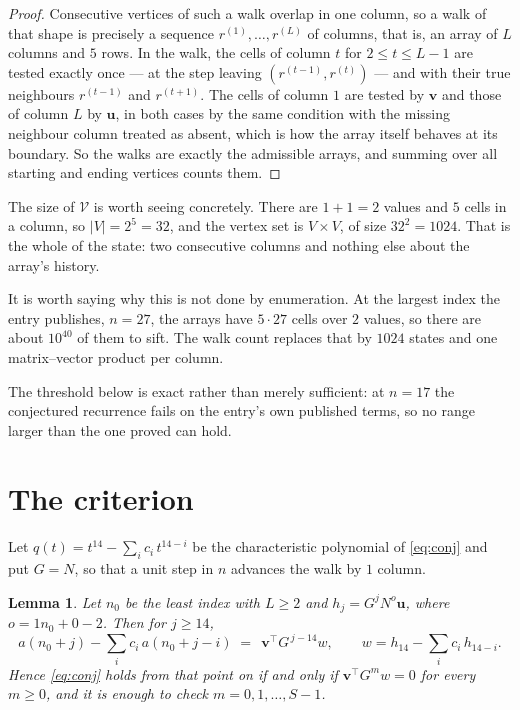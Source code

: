 \documentclass[11pt,a4paper]{article}
\theoremstyle{plain}
\newtheorem{lemma}[theorem]{Lemma}
\theoremstyle{definition}
\begin{document}
\begin{proof}
Consecutive vertices of such a walk overlap in one column, so a walk of that shape is
precisely a sequence $r^{(1)},\dots,r^{(L)}$ of columns, that is, an array of $L$ columns
and $5$ rows. In the walk, the cells of column $t$ for $2\le t\le L-1$ are tested
exactly once --- at the step leaving $(r^{(t-1)},r^{(t)})$ --- and with their true
neighbours $r^{(t-1)}$ and $r^{(t+1)}$. The cells of column $1$ are tested by
$\mathbf{v}$ and those of column $L$ by $\mathbf{u}$, in both cases by the same condition
with the missing neighbour column treated as absent, which is how the array itself behaves at
its boundary. So the walks are exactly the admissible arrays, and summing over all starting
and ending vertices counts them.
\end{proof}


The size of $\mathcal V$ is worth seeing concretely. There are $1+1=2$ values
and $5$ cells in a column, so $|V|=2^{5}=32$, and the vertex set is
$V\times V$, of size $32^2=1024$. That is the whole of the state: two consecutive
columns and nothing else about the array's history.

It is worth saying why this is not done by enumeration. At the largest index the entry
publishes, $n=27$, the arrays have $5\cdot27$ cells over
$2$ values, so there are about $10^{40}$ of them to sift. The
walk count replaces that by $1024$ states and one matrix--vector product per column.

The threshold below is exact rather than merely sufficient: at $n=17$ the conjectured
recurrence fails on the entry's own published terms, so no range larger than the one proved
can hold.
\section{The criterion}

Let $q(t)=t^{14}-\sum_i c_i\,t^{14-i}$ be the characteristic polynomial of
\eqref{eq:conj} and put $G=N$, so that a unit step in $n$ advances the walk by
$1$ column.

\begin{lemma}\label{lem:crit}
Let $n_0$ be the least index with $L\ge2$ and $h_j=G^{j}N^{o}\mathbf{u}$, where
$o=1n_0+0-2$. Then for $j\ge14$,
\[
a(n_0+j)-\sum_i c_i\,a(n_0+j-i)\;=\;\,\mathbf{v}^{\!\top}G^{\,j-14}w,
\qquad w=h_{14}-\sum_i c_i\,h_{14-i} .
\]
Hence \eqref{eq:conj} holds from that point on if and only if
$\mathbf{v}^{\!\top}G^{m}w=0$ for every $m\ge0$, and it is enough to check
$m=0,1,\dots,S-1$.
\end{lemma}
\end{document}
